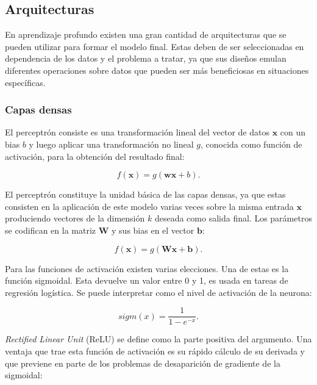\subsection{Arquitecturas}

En aprendizaje profundo existen una gran cantidad de arquitecturas que se pueden utilizar para formar el modelo 
final. Estas deben de ser seleccionadas en dependencia de los datos y el problema a tratar, ya que sus diseños 
emulan diferentes operaciones sobre datos que pueden ser más beneficiosas en situaciones específicas.

\subsubsection{Capas densas}

El perceptrón consiste es una transformación lineal del vector de datos $\textbf{x}$ con un bias $b$ y 
luego aplicar una transformación no lineal $g$, conocida como función de activación, 
para la obtención del resultado final:

\begin{equation}
	f(\textbf{x}) = g(\textbf{w}\textbf{x} + b).
\end{equation}

El perceptrón constituye la unidad básica de las capas densas, ya que estas consisten en la aplicación
de este modelo varias veces sobre la misma entrada $\textbf{x}$ produciendo vectores de la dimensión $k$ 
deseada como salida final. Los parámetros se codifican en la matriz $\textbf{W}$ y sus bias en el 
vector $\textbf{b}$:

\begin{equation}
	f(\textbf{x}) = g(\textbf{Wx} + \textbf{b}).
\end{equation}

Para las funciones de activación existen varias elecciones. Una de estas es la función sigmoidal. 
Esta devuelve un valor entre 0 y 1, es usada en tareas de regresión logística. 
Se puede interpretar como el nivel de activación de la neurona:

\begin{equation}
	sigm(x) = \frac{1}{1-e^{-x}}.
\end{equation}

\emph{Rectified Linear Unit} (ReLU) se define como la parte positiva del argumento. Una ventaja que trae esta 
función de activación es su rápido cálculo de su derivada y que previene en parte de los problemas 
de desaparición de gradiente de la sigmoidal:

